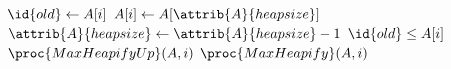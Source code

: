 \begin{codebox}
\li $\id{old} \gets A[i]$
\li $A[i] \gets A[\attrib{A}{heapsize}]$
\li $\attrib{A}{heapsize} \gets \attrib{A}{heapsize} - 1$
\li \If $\id{old} \leq A[i]$
\li     \Then
            $\proc{MaxHeapifyUp}(A,i)$
\li     \Else
\li         $\proc{MaxHeapify}(A,i)$
        \End
\end{codebox}